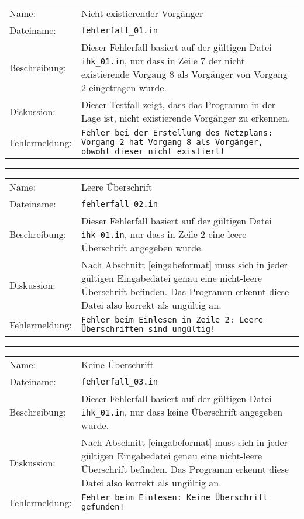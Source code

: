 \begin{tabularx}{\textwidth}{l X}
  Name: & Nicht existierender Vorg\"anger \\
  Dateiname: & \texttt{fehlerfall\_01.in} \\
  Beschreibung: & Dieser Fehlerfall basiert auf der g\"ultigen Datei
  \texttt{ihk\_01.in}, nur dass in Zeile 7 der nicht existierende
  Vorgang 8 als Vorg\"anger von Vorgang 2 eingetragen wurde.\\
  Diskussion: & Dieser Testfall zeigt, dass das Programm in der Lage
  ist, nicht existierende Vorg\"anger zu erkennen. \\
  Fehlermeldung: & \texttt{Fehler bei der Erstellung des Netzplans:
    Vorgang 2 hat Vorgang 8 als Vorgänger, obwohl dieser nicht
    existiert!} \\
\end{tabularx}
\hrule
\begin{tabularx}{\textwidth}{l X}
  Name: & Leere \"Uberschrift \\
  Dateiname: & \texttt{fehlerfall\_02.in} \\
  Beschreibung: & Dieser Fehlerfall basiert auf der g\"ultigen Datei
  \texttt{ihk\_01.in}, nur dass in Zeile 2 eine leere \"Uberschrift
  angegeben wurde. \\
  Diskussion: & Nach Abschnitt \ref{eingabeformat} muss sich in jeder
  g\"ultigen Eingabedatei genau eine nicht-leere \"Uberschrift
  befinden. Das Programm erkennt diese Datei also korrekt als
  ung\"ultig an. \\
  Fehlermeldung: & \texttt{Fehler beim Einlesen in Zeile 2: Leere
    Überschriften sind ungültig!} \\
\end{tabularx}
\hrule
\begin{tabularx}{\textwidth}{l X}
  Name: & Keine \"Uberschrift \\
  Dateiname: & \texttt{fehlerfall\_03.in} \\
  Beschreibung: & Dieser Fehlerfall basiert auf der g\"ultigen Datei
  \texttt{ihk\_01.in}, nur dass keine \"Uberschrift
  angegeben wurde. \\
  Diskussion: & Nach Abschnitt \ref{eingabeformat} muss sich in jeder
  g\"ultigen Eingabedatei genau eine nicht-leere \"Uberschrift
  befinden. Das Programm erkennt diese Datei also korrekt als
  ung\"ultig an. \\
  Fehlermeldung: & \texttt{Fehler beim Einlesen: Keine Überschrift
    gefunden!} \\
\end{tabularx}
